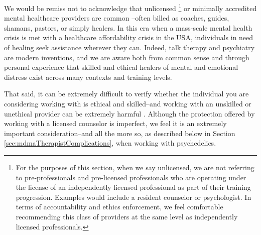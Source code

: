 \documentclass[12pt,letterpaper]{book}
\begin{document}
We would be remiss not to acknowledge that unlicensed \footnote{For the purposes of this section, when we say unlicensed, we are not referring to pre-professionals and pre-licensed professionals who are operating under the license of an independently licensed professional as part of their training progression. Examples would include a resident counselor or psychologist. In terms of accountability and ethics enforcement, we feel comfortable recommending this class of providers at the same level as independently licensed professionals.} or minimally accredited mental healthcare providers are common \cite{aboujaoude2020coachingVSTherapy} –often billed as coaches, guides, shamans, pastors, or simply healers. In this era when a mass-scale mental health crisis is met with a healthcare affordability crisis in the USA, individuals in need of healing seek assistance wherever they can. Indeed, talk therapy and psychiatry are modern inventions, and we are aware both from common sense and through personal experience that skilled and ethical healers of mental and emotional distress exist across many contexts and training levels. 

That said, it can be extremely difficult to verify whether the individual you are considering working with is ethical and skilled–and working with an unskilled or unethical provider can be extremely harmful \cite{hook2018boundary,therapisttocoach}. Although the protection offered by working with a licensed counselor is imperfect, we feel it is an extremely important consideration–and all the more so, as described below in Section \ref{sec:mdmaTherapistComplications}, when working with psychedelics. 
\end{document}

